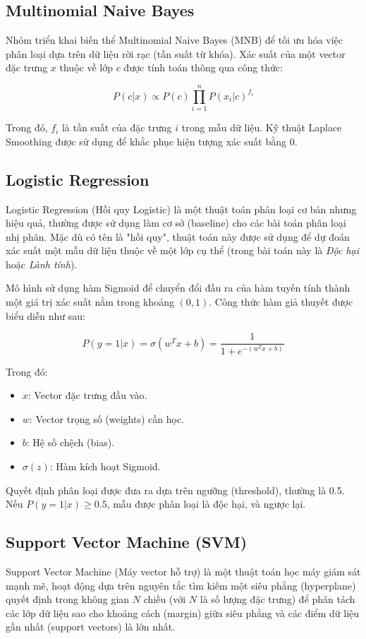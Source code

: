 \documentclass[a4paper,12pt]{report}
\begin{document}
\subsection{Multinomial Naive Bayes}
Nhóm triển khai biến thể Multinomial Naive Bayes (MNB) để tối ưu hóa việc phân loại dựa trên dữ liệu rời rạc (tần suất từ khóa). Xác suất của một vector đặc trưng $x$ thuộc về lớp $c$ được tính toán thông qua công thức:

$$P(c|x) \propto P(c) \prod_{i=1}^{n} P(x_i|c)^{f_i}$$

Trong đó, $f_i$ là tần suất của đặc trưng $i$ trong mẫu dữ liệu. Kỹ thuật Laplace Smoothing được sử dụng để khắc phục hiện tượng xác suất bằng 0.

\subsection{Logistic Regression}
Logistic Regression (Hồi quy Logistic) là một thuật toán phân loại cơ bản nhưng hiệu quả, thường được sử dụng làm cơ sở (baseline) cho các bài toán phân loại nhị phân. Mặc dù có tên là "hồi quy", thuật toán này được sử dụng để dự đoán xác suất một mẫu dữ liệu thuộc về một lớp cụ thể (trong bài toán này là \textit{Độc hại} hoặc \textit{Lành tính}).

Mô hình sử dụng hàm Sigmoid để chuyển đổi đầu ra của hàm tuyến tính thành một giá trị xác suất nằm trong khoảng $(0, 1)$. Công thức hàm giả thuyết được biểu diễn như sau:

\begin{equation}
    P(y=1|x) = \sigma(w^T x + b) = \frac{1}{1 + e^{-(w^T x + b)}}
\end{equation}

Trong đó:
\begin{itemize}
    \item $x$: Vector đặc trưng đầu vào.
    \item $w$: Vector trọng số (weights) cần học.
    \item $b$: Hệ số chệch (bias).
    \item $\sigma(z)$: Hàm kích hoạt Sigmoid.
\end{itemize}

Quyết định phân loại được đưa ra dựa trên ngưỡng (threshold), thường là 0.5. Nếu $P(y=1|x) \geq 0.5$, mẫu được phân loại là độc hại, và ngược lại.

\subsection{Support Vector Machine (SVM)}
Support Vector Machine (Máy vector hỗ trợ) là một thuật toán học máy giám sát mạnh mẽ, hoạt động dựa trên nguyên tắc tìm kiếm một siêu phẳng (hyperplane) quyết định trong không gian $N$ chiều (với $N$ là số lượng đặc trưng) để phân tách các lớp dữ liệu sao cho khoảng cách (margin) giữa siêu phẳng và các điểm dữ liệu gần nhất (support vectors) là lớn nhất.
\end{document}
